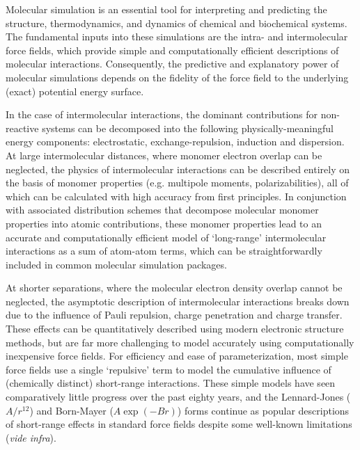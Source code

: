 Molecular simulation is an essential tool for interpreting and predicting
the structure, thermodynamics, and dynamics of chemical and
biochemical systems.  The fundamental inputs into these simulations are the
intra- and intermolecular force fields, which provide simple and
computationally efficient descriptions of molecular interactions.
Consequently, the predictive and explanatory power of molecular simulations
depends on the fidelity of the force field to the underlying (exact) potential
energy surface.

In the case of intermolecular interactions, the dominant contributions for
non-reactive systems can be decomposed into the following
physically-meaningful
energy components: electrostatic, exchange-repulsion, induction and dispersion. 
\cite{stone2013theory,margenau1969theory,Riley2010,Stone2007,Dykstra2000}
At large intermolecular distances, where monomer electron overlap can be
neglected, the physics of intermolecular interactions can be described
entirely on the basis of monomer properties (e.g. multipole moments,
polarizabilities), all of which can be calculated with high accuracy from
first principles. 
\cite{Stone1984}
In conjunction with associated distribution schemes that decompose 
molecular monomer properties into atomic contributions,
\cite{stone2013theory,Stone2007,Williams2003,Misquitta2006,Dehez2001,Stone2005,Misquitta2014}
these monomer properties lead to an accurate and computationally efficient
model of `long-range' intermolecular interactions as a sum of atom-atom terms, which
can be straightforwardly included in common molecular simulation packages.

At shorter separations, where the molecular electron density
overlap cannot be neglected, the asymptotic description of
intermolecular interactions breaks down due to the influence of Pauli
repulsion, charge penetration and charge transfer.  These effects
can be quantitatively described using modern electronic
structure methods,\cite{Riley2010,Jeziorski1994,Szalewicz2012,Raghavachari1989,Grimme2011} 
but are far more challenging to model accurately using computationally
inexpensive force fields.
For efficiency and ease of parameterization, most simple force fields use a single
`repulsive' term to model the cumulative influence of (chemically distinct)
short-range interactions. 
These simple models have seen comparatively little progress over the past
eighty years, and the Lennard-Jones\cite{Lennard-Jones1931} (${A}/{r^{12}}$)
and Born-Mayer \cite{Born1932,Buckingham1938}
($A\exp(-Br)$) forms continue as popular descriptions of
short-range effects in standard force fields despite some well-known
limitations (\emph{vide infra}).  

